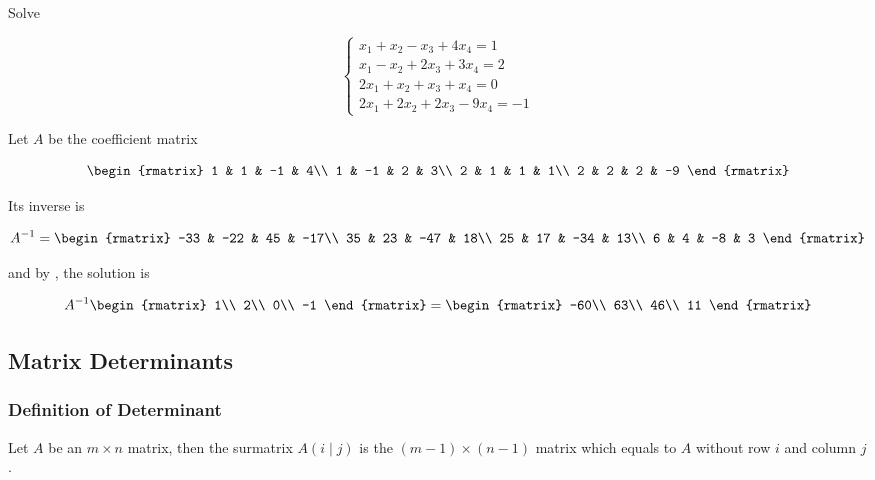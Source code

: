 \documentclass[a4paper,12pt]{article}
\begin{document}
\begin{exm}
  Solve

  $$\begin{cases}
    x_{1}+x_{2}-x_{3}+4x_{4}=1\\
    x_{1}-x_{2}+2x_{3}+3x_{4}=2\\
    2x_{1}+x_{2}+x_{3}+x_{4}=0\\
    2x_{1}+2x_{2}+2x_{3}-9x_{4}=-1
  \end{cases}$$\s

  \ans Let $A$ be the coefficient matrix

  $$\begin{rmatrix}
    1 & 1 & -1 & 4\\
    1 & -1 & 2 & 3\\
    2 & 1 & 1 & 1\\
    2 & 2 & 2 & -9
  \end{rmatrix}$$\s

  Its inverse is

  $$A^{-1}=\begin{rmatrix}
    -33 & -22 & 45 & -17\\
    35 & 23 & -47 & 18\\
    25 & 17 & -34 & 13\\
    6 & 4 & -8 & 3
  \end{rmatrix}$$\s

  and by \rthm[\sctd{1}], the solution is

  $$A^{-1}\begin{rmatrix}
    1\\
    2\\
    0\\
    -1
  \end{rmatrix}=\begin{rmatrix}
    -60\\
    63\\
    46\\
    11
  \end{rmatrix}$$
\end{exm}

\subsection{Matrix Determinants}
\subsubsection{Definition of Determinant}
\begin{dft}
  Let $A$ be an $m\times n$ matrix, then the surmatrix $A(i\!\mid\!j)$ is the $(m-1)\times(n-1)$ matrix which equals to $A$ without row $i$ and column $j$.
\end{dft}\n
\end{document}
